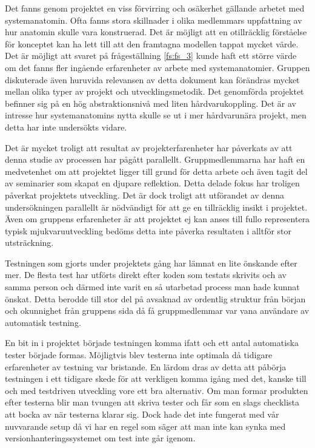 

Det fanns genom projektet en viss förvirring och osäkerhet gällande arbetet med systemanatomin. Ofta fanns stora skillnader i olika medlemmars uppfattning av hur anatomin skulle vara konstruerad. Det är möjligt att en otillräcklig förståelse för konceptet kan ha lett till att den framtagna modellen tappat mycket värde. Det är möjligt att svaret på frågeställning \ref{fs:fs_3} kunde haft ett större värde om det fanns fler ingående erfarenheter av arbete med systemanatomier. Gruppen diskuterade även huruvida relevansen av detta dokument kan förändras mycket mellan olika typer av projekt och utvecklingsmetodik. Det genomförda projektet befinner sig på en hög abstraktionsnivå med liten hårdvarukoppling. Det är av intresse hur systemanatomins nytta skulle se ut i mer hårdvarunära projekt, men detta har inte undersökts vidare.

Det är mycket troligt att resultat av projekterfarenheter har påverkats av att denna studie av processen har pågått parallellt. Gruppmedlemmarna har haft en medvetenhet om att projektet ligger till grund för detta arbete och även tagit del av seminarier som skapat en djupare reflektion. Detta delade fokus har troligen påverkat projektets utveckling. Det är dock troligt att utförandet av denna undersökningen parallellt är nödvändigt för att ge en tillräcklig insikt i projektet. Även om gruppens erfarenheter är att projektet ej kan anses till fullo representera typisk mjukvaruutveckling bedöms detta inte påverka resultaten i alltför stor utsträckning.

Testningen som gjorts under projektets gång har lämnat en lite önskande efter mer. De flesta test har utförts direkt efter koden som testats skrivits och av samma person och därmed inte varit en så utarbetad process man hade kunnat önskat. Detta berodde till stor del på avsaknad av ordentlig struktur från början och okunnighet från gruppens sida då få gruppmedlemmar var vana användare av automatisk testning.

En bit in i projektet började testningen komma ifatt och ett antal automatiska tester började formas. Möjligtvis blev testerna inte optimala då tidigare erfarenheter av testning var bristande. En lärdom dras av detta att påbörja testningen i ett tidigare skede för att verkligen komma igång med det, kanske till och med testdriven utveckling vore ett bra alternativ.\cite{TDD} Om man formar produkten efter testerna blir man tvungen att skriva tester och får som en slags checklista att bocka av när testerna klarar sig. Dock hade det inte fungerat med vår nuvvarande setup då vi har en regel som säger att man inte kan synka med versionhanteringssystemet om test inte går igenom. 


